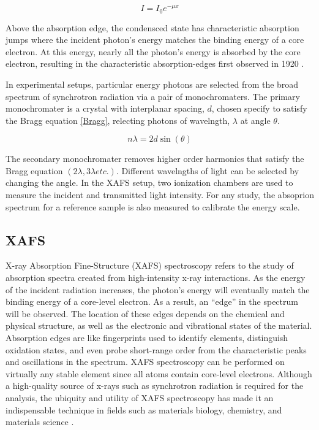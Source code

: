 \begin{equation}
    \label{BeerLambert}
    I = I_0 e^{-\mu x}
\end{equation}

Above the absorption edge, the condensced state has characteristic absorption jumps where the incident photon's energy matches the binding energy of a core electron. At this energy, nearly all the photon's energy is absorbed by the core electron, resulting in the characteristic absorption-edges first observed in 1920 \cite{fricke1920, hertz1920ueber}.

In experimental setups, particular energy photons are selected from the broad spectrum of synchrotron radiation via a pair of monochromaters. The primary monochromater is a crystal with interplanar spacing, $ d $, chosen specify to satisfy the Bragg equation \ref{Bragg}, relecting photons of wavelngth, $ \lambda $ at angle $ \theta $.  

\begin{equation}
    \label{Bragg}
    n\lambda = 2d\sin(\theta)
\end{equation}

The secondary monochromater removes higher order harmonics that satisfy the Bragg equation $ (2\lambda, 3\lambda etc.). $ Different wavelngths of light can be selected by changing the angle. In the XAFS setup, two ionization chambers are used to measure the incident and transmitted light intensity. For any study, the absoprion spectrum for a reference sample is also measured to calibrate the energy scale.


\subsection{XAFS}
X-ray Absorption Fine-Structure (XAFS) spectroscopy refers to the study of absorption spectra created from high-intensity x-ray interactions. As the energy of the incident radiation increases, the photon's energy will eventually match the binding energy of a core-level electron. As a result, an ``edge'' in the spectrum will be observed. The location of these edges depends on the chemical and physical structure, as well as the electronic and vibrational states of the material. Absorption edges are like fingerprints used to identify elements, distinguish oxidation states, and even probe short-range order from the characteristic peaks and oscillations in the spectrum. XAFS spectroscopy can be performed on virtually any stable element since all atoms contain core-level electrons. Although a high-quality source of x-rays such as synchrotron radiation is required for the analysis, the ubiquity and utility of XAFS spectroscopy has made it an indispensable technique in fields such as materials biology, chemistry, and materials science \cite{rehrXAFS2000review} \cite{newville2014fundamentals}.

